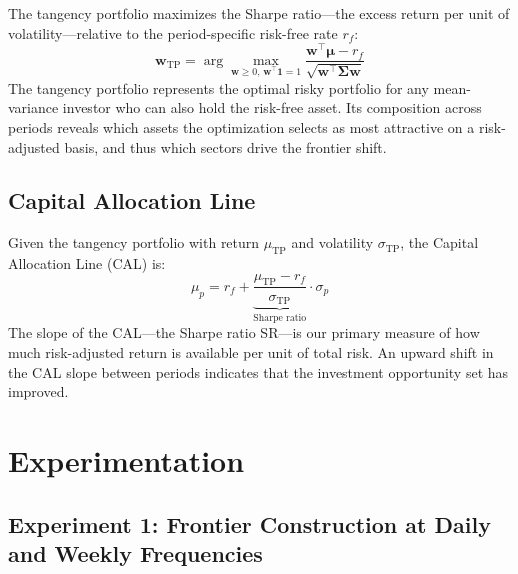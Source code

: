 \documentclass[12pt,a4paper]{article}
\begin{document}
The tangency portfolio maximizes the Sharpe ratio---the excess return per unit of
volatility---relative to the period-specific risk-free rate $r_f$:
\begin{equation}
    \mathbf{w}_{\text{TP}} = \arg\max_{\mathbf{w} \geq 0,\, \mathbf{w}^\top\mathbf{1}=1}
    \frac{\mathbf{w}^\top \boldsymbol{\mu} - r_f}{\sqrt{\mathbf{w}^\top \boldsymbol{\Sigma} \mathbf{w}}}
\end{equation}
The tangency portfolio represents the optimal risky portfolio for any mean-variance
investor who can also hold the risk-free asset. Its composition across periods reveals
which assets the optimization selects as most attractive on a risk-adjusted basis,
and thus which sectors drive the frontier shift.

\subsection{Capital Allocation Line}

Given the tangency portfolio with return $\mu_{\text{TP}}$ and volatility
$\sigma_{\text{TP}}$, the Capital Allocation Line (CAL) is:
\begin{equation}
    \mu_p = r_f + \underbrace{\frac{\mu_{\text{TP}} - r_f}{\sigma_{\text{TP}}}}_{\text{Sharpe ratio}} \cdot \sigma_p
\end{equation}
The slope of the CAL---the Sharpe ratio SR---is our primary measure of how much
risk-adjusted return is available per unit of total risk. An upward shift in the CAL
slope between periods indicates that the investment opportunity set has improved.

\section{Experimentation}
\label{sec:experiments}

\subsection{Experiment 1: Frontier Construction at Daily and Weekly Frequencies}
\end{document}
